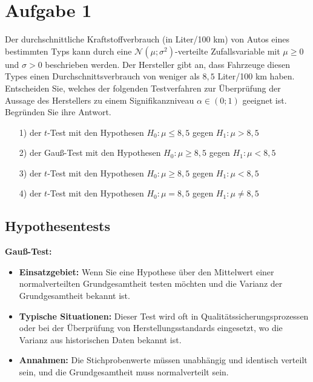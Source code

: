 \documentclass[main.tex]{subfiles}
\begin{document}
\section{Aufgabe 1}
Der durchschnittliche Kraftstoffverbrauch (in Liter/100 km) von Autos eines bestimmten Typs kann durch eine $\mathcal{N}(\mu; \sigma^2)$-verteilte Zufallsvariable mit $\mu \geq 0$ und $\sigma > 0$ beschrieben werden. Der Hersteller gibt an, dass Fahrzeuge diesen Types einen Durchschnittsverbrauch von weniger als $8,5$ Liter/100 km haben. \\[2mm]
%
Entscheiden Sie, welches der folgenden Testverfahren zur Überprüfung der Aussage des Herstellers zu einem Signifikanzniveau $\alpha \in (0;1)$ geeignet ist. Begründen Sie ihre Antwort.
\begin{enumerate}
	\item[1)] der $t$-Test mit den Hypothesen $H_0: \mu \leq 8,5$ gegen $H_1: \mu > 8,5$
	\item[2)] der Gauß-Test mit den Hypothesen $H_0: \mu \geq 8,5$ gegen $H_1: \mu < 8,5$
	\item[3)] der $t$-Test mit den Hypothesen $H_0: \mu \geq 8,5$ gegen $H_1: \mu < 8,5$
	\item[4)] der $t$-Test mit den Hypothesen $H_0: \mu = 8,5$ gegen $H_1: \mu \neq 8,5$
\end{enumerate}

\subsection{Hypothesentests}

\textbf{Gauß-Test:}
\begin{itemize}
\item \textbf{Einsatzgebiet:} Wenn Sie eine Hypothese über den Mittelwert einer normalverteilten Grundgesamtheit testen möchten und die Varianz der Grundgesamtheit bekannt ist.
\item \textbf{Typische Situationen:} Dieser Test wird oft in Qualitätssicherungsprozessen oder bei der Überprüfung von Herstellungsstandards eingesetzt, wo die Varianz aus historischen Daten bekannt ist.
\item \textbf{Annahmen:} Die Stichprobenwerte müssen unabhängig und identisch verteilt sein, und die Grundgesamtheit muss normalverteilt sein.
\end{itemize}
\end{document}
